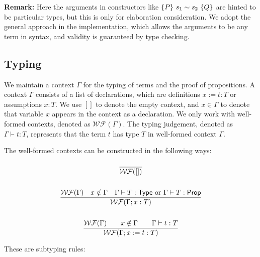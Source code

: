 \textbf{Remark:} Here the arguments in constructors like $\{P\}~s_1 \sim s_2~\{Q\}$ are hinted to be particular types, but this is only for elaboration consideration. We adopt the general approach in the implementation, which allows the arguments to be any term in syntax, and validity is guaranteed by type checking.


\subsection{Typing}

\newcommand{\WF}[1]{\ensuremath{\mathcal{WF}(#1)}}

We maintain a context $\Gamma$ for the typing of terms and the proof of propositions. 
A context $\Gamma$ consists of a list of declarations, which are definitions $x := t : T$ or assumptions $x : T$. 
We use $[]$ to denote the empty context, and $x \in \Gamma$ to denote that variable $x$ appears in the context as a declaration.
We only work with well-formed contexts, denoted as \WF{\Gamma}. 
The typing judgement, denoted as $\Gamma \vdash t : T$, represents that the term $t$ has type $T$ in well-formed context $\Gamma$. 


The well-formed contexts can be constructed in the following ways:

\begin{gather*}
    \frac{}{\WF{[]}} \\
    \\
    \frac{\WF{\Gamma} \quad x \notin \Gamma \quad \Gamma \vdash T : \Type \text{ or } \Gamma \vdash T : \prop}{\WF{\Gamma;x:T}} \\
    \\
    \frac{\WF{\Gamma} \qquad x \notin \Gamma \qquad \Gamma \vdash t : T}{\WF{\Gamma;x := t : T}} \\
\end{gather*}

These are subtyping rules:
\begin{gather*}
\end{gather*}


